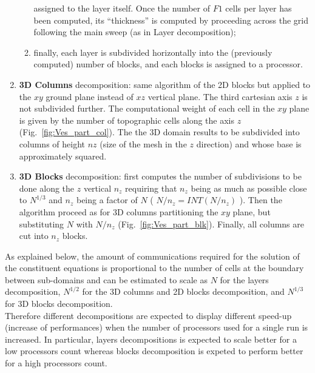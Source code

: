 \begin{enumerate}
\begin{enumerate}
assigned to the layer itself. 
Once the number of $F1$ cells per layer has been computed, its ``thickness'' is computed 
by proceeding across the grid following the main sweep (as in Layer decomposition);
\item finally, each layer is subdivided horizontally into the (previously computed) number
of blocks, and each blocks is assigned to a processor. 
\end{enumerate}
\item {\bf 3D Columns } decomposition: same algorithm of the 2D blocks but applied to the $xy$ 
ground plane instead of $xz$ vertical plane. The third cartesian axis $z$ is not subdivided
further. The computational weight of each cell in the $xy$ plane is given by the number of 
topographic cells along the axis $z$ (Fig.~\ref{fig:Ves_part_col}). The the 3D domain results 
to be subdivided into columns of height $nz$ (size of the mesh in the $z$ direction) and whose base
is approximately squared.
\item {\bf 3D Blocks} decomposition: first computes the number of subdivisions to be done
along the $z$ vertical $n_z$ requiring that $n_z$ being as much as possible
close to $N^{1/3}$ and $n_z$ being a factor of $N$ ( $N/n_z = INT(N/n_z)$ ).
Then the algorithm proceed as for 3D columns partitioning the $xy$ plane, 
but substituting $N$ with $N/n_z$ (Fig.~\ref{fig:Ves_part_blk}). 
Finally, all columns are cut into $n_z$ blocks.
\end{enumerate}

As explained below, the amount of communications required for the solution 
of the constituent equations
is proportional to the number of cells at the boundary between sub-domains
and can be estimated to scale as $N$ for the layers decomposition, 
$N^{1/2}$ for the 3D columns
and 2D blocks decomposition, and $N^{1/3}$ for 3D blocks decomposition.\\
Therefore different decompositions are expected to display different speed-up
(increase of performances) when the number of processors used for a single run
is increased. In particular, layers decompositions is expected to scale better
for a low processors count whereas blocks decomposition is expeted to perform 
better for a high processors count.

